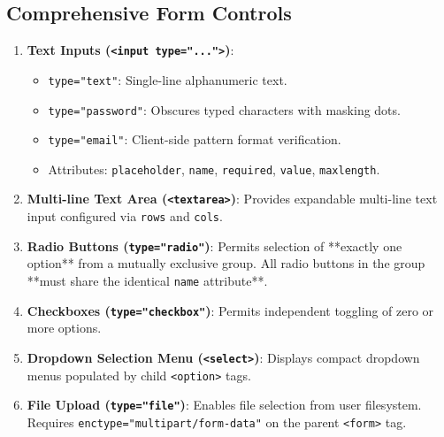 \subsection{Comprehensive Form Controls}
\begin{enumerate}[leftmargin=1.5em]
    \item \textbf{Text Inputs (\texttt{<input type="...">})}:
    \begin{itemize}
        \item \texttt{type="text"}: Single-line alphanumeric text.
        \item \texttt{type="password"}: Obscures typed characters with masking dots.
        \item \texttt{type="email"}: Client-side pattern format verification.
        \item Attributes: \texttt{placeholder}, \texttt{name}, \texttt{required}, \texttt{value}, \texttt{maxlength}.
    \end{itemize}
    \item \textbf{Multi-line Text Area (\texttt{<textarea>})}: Provides expandable multi-line text input configured via \texttt{rows} and \texttt{cols}.
    \item \textbf{Radio Buttons (\texttt{type="radio"})}: Permits selection of **exactly one option** from a mutually exclusive group. All radio buttons in the group **must share the identical \texttt{name} attribute**.
    \item \textbf{Checkboxes (\texttt{type="checkbox"})}: Permits independent toggling of zero or more options.
    \item \textbf{Dropdown Selection Menu (\texttt{<select>})}: Displays compact dropdown menus populated by child \texttt{<option>} tags.
    \item \textbf{File Upload (\texttt{type="file"})}: Enables file selection from user filesystem. Requires \texttt{enctype="multipart/form-data"} on the parent \texttt{<form>} tag.
\end{enumerate}

